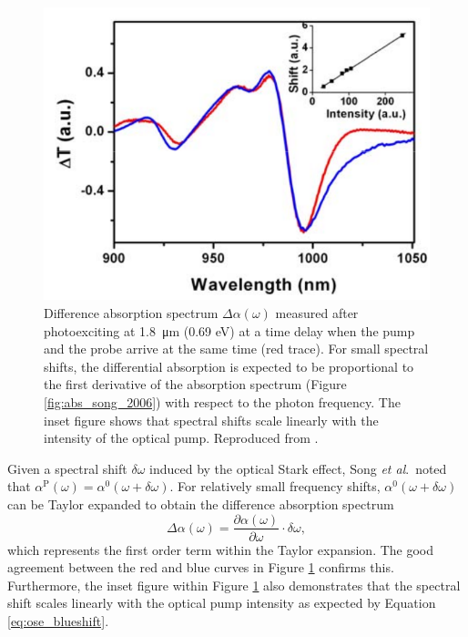 \begin{figure}[ht]
	\centering
	\includegraphics[scale=0.4]{images/chapter_prior_works/dtt_song_2006}
	\caption{Difference absorption spectrum $\Delta \alpha(\omega)$ measured after photoexciting at \SI{1.8}{\um} (0.69 eV) at a time delay when the pump and the probe arrive at the same time (red trace). For small spectral shifts, the differential absorption is expected to be proportional to the first derivative of the absorption spectrum (Figure \ref{fig:abs_song_2006}) with respect to the photon frequency. The inset figure shows that spectral shifts scale linearly with the intensity of the optical pump. Reproduced from \cite{song2006optical}.}
	\label{fig:dtt_song_2006}
\end{figure}

Given a spectral shift $\delta \omega$ induced by the optical Stark effect, Song \textit{et al}.\ noted that $\alpha^\text{P}(\omega) = \alpha^0 (\omega + \delta \omega)$. For relatively small frequency shifts, $\alpha^0 (\omega + \delta \omega)$ can be Taylor expanded to obtain the difference absorption spectrum
\begin{equation}
	\Delta \alpha(\omega) = \frac{\partial \alpha(\omega)}{\partial \omega} \cdot \delta\omega,
\end{equation}
which represents the first order term within the Taylor expansion. The good agreement between the red and blue curves in Figure \ref{fig:dtt_song_2006} confirms this. Furthermore, the inset figure within Figure \ref{fig:dtt_song_2006} also demonstrates that the spectral shift scales linearly with the optical pump intensity as expected by Equation \eqref{eq:ose_blueshift}.

